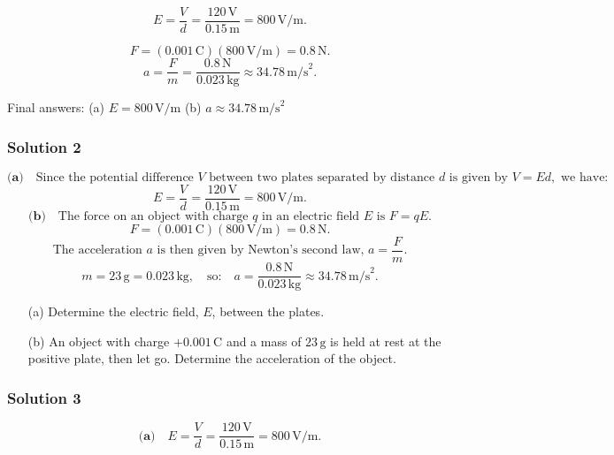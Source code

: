 \documentclass{article}
\begin{document}
\[
E = \frac{V}{d} = \frac{120 \, \text{V}}{0.15 \, \text{m}} = 800 \, \text{V/m}.
\]

\[
F = (0.001 \, \text{C})(800 \, \text{V/m}) = 0.8 \, \text{N}.
\]
\[
a = \frac{F}{m} = \frac{0.8 \, \text{N}}{0.023 \, \text{kg}} \approx 34.78 \, \text{m/s}^2.
\]

 Final answers:
 (a) \( E = 800 \, \text{V/m} \)
 (b) \( a \approx 34.78 \, \text{m/s}^2 \)


\subsubsection{Solution 2}
\[
\textbf{(a)} \quad \text{Since the potential difference } V \text{ between two plates separated by distance } d \text{ is given by } V = Ed, \text{ we have:}
\]
\[
E = \frac{V}{d} = \frac{120 \, \text{V}}{0.15 \, \text{m}} = 800 \, \text{V/m}.
\]
\[
\textbf{(b)} \quad \text{The force on an object with charge } q \text{ in an electric field } E \text{ is } F = qE.
\]
\[
F = (0.001 \, \text{C})(800 \, \text{V/m}) = 0.8 \, \text{N}.
\]
\[
\text{The acceleration } a \text{ is then given by Newton's second law, } a = \frac{F}{m}.
\]
\[
m = 23 \, \text{g} = 0.023 \, \text{kg}, \quad \text{so:} \quad a = \frac{0.8 \, \text{N}}{0.023 \, \text{kg}} \approx 34.78 \, \text{m/s}^2.
\]


\begin{enumerate}
    \item[(a)] Determine the electric field, $E$, between the plates.
    \item[(b)] An object with charge $+0.001 \, \text{C}$ and a mass of $23 \, \text{g}$ is held at rest at the positive plate, then let go. Determine the acceleration of the object.
\end{enumerate}

\subsubsection{Solution 3}
\[
\textbf{(a)}\quad E = \frac{V}{d} = \frac{120\,\text{V}}{0.15\,\text{m}} = 800\,\text{V/m}.
\]
\end{document}
